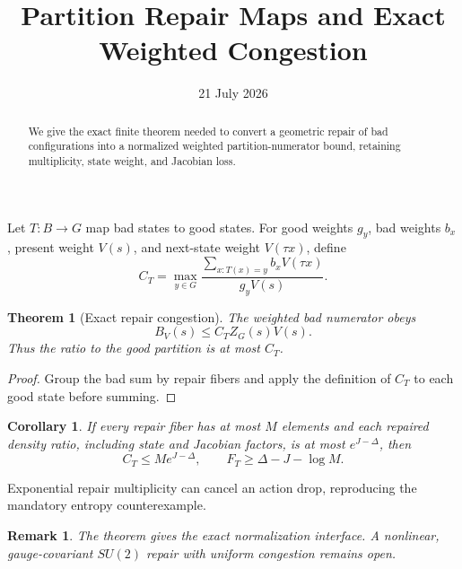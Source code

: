 \documentclass[11pt]{article}\usepackage[margin=1in]{geometry}\usepackage{amsmath,amsthm}\newtheorem{theorem}{Theorem}\newtheorem{corollary}{Corollary}\newtheorem{remark}{Remark}
\title{Partition Repair Maps and Exact Weighted Congestion}\author{}\date{21 July 2026}
\begin{document}
\maketitle
\begin{abstract}We give the exact finite theorem needed to convert a geometric repair of bad configurations into a normalized weighted partition-numerator bound, retaining multiplicity, state weight, and Jacobian loss.\end{abstract}
Let $T:B\to G$ map bad states to good states. For good weights $g_y$, bad weights $b_x$, present weight $V(s)$, and next-state weight $V(\tau x)$, define
\[C_T=\max_{y\in G}\frac{\sum_{x:T(x)=y}b_xV(\tau x)}{g_yV(s)}.\]
\begin{theorem}[Exact repair congestion]The weighted bad numerator obeys
\[B_V(s)\le C_T Z_G(s)V(s).\]
Thus the ratio to the good partition is at most $C_T$.\end{theorem}
\begin{proof}Group the bad sum by repair fibers and apply the definition of $C_T$ to each good state before summing.\end{proof}
\begin{corollary}If every repair fiber has at most $M$ elements and each repaired density ratio, including state and Jacobian factors, is at most $e^{J-\Delta}$, then
\[C_T\le Me^{J-\Delta},\qquad F_T\ge\Delta-J-\log M.\]
\end{corollary}
Exponential repair multiplicity can cancel an action drop, reproducing the mandatory entropy counterexample.
\begin{remark}The theorem gives the exact normalization interface. A nonlinear, gauge-covariant $SU(2)$ repair with uniform congestion remains open.\end{remark}
\end{document}
